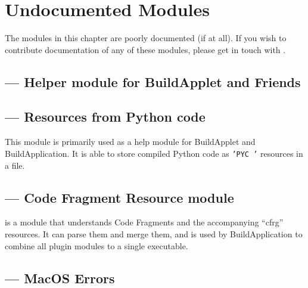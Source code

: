 \chapter{Undocumented Modules \label{undocumented-modules}}


The modules in this chapter are poorly documented (if at all).  If you
wish to contribute documentation of any of these modules, please get in
touch with .

\localmoduletable


\section{ --- Helper module for BuildApplet and Friends}


\section{ --- Resources from Python code}

This module is primarily used as a help module for BuildApplet and
BuildApplication.  It is able to store compiled Python code as
\texttt{'PYC '} resources in a file.


\section{ --- Code Fragment Resource module}

 is a module that understands Code Fragments and the
accompanying ``cfrg'' resources. It can parse them and merge them, and is
used by BuildApplication to combine all plugin modules to a single
executable.


\section{ --- MacOS Errors}

